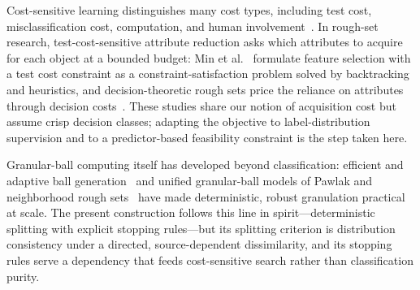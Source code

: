 
Cost-sensitive learning distinguishes many cost types, including test cost, misclassification cost, computation, and human involvement~\cite{Turney2000}. In rough-set research, test-cost-sensitive attribute reduction asks which attributes to acquire for each object at a bounded budget: Min et al.~\cite{Min2014TestCost} formulate feature selection with a test cost constraint as a constraint-satisfaction problem solved by backtracking and heuristics, and decision-theoretic rough sets price the reliance on attributes through decision costs~\cite{Jia2013MinCost,Zhao2009DTRS}. These studies share our notion of acquisition cost but assume crisp decision classes; adapting the objective to label-distribution supervision and to a predictor-based feasibility constraint is the step taken here.

Granular-ball computing itself has developed beyond classification: efficient and adaptive ball generation~\cite{Xia2023GBadaptive} and unified granular-ball models of Pawlak and neighborhood rough sets~\cite{Xia2023GBRS} have made deterministic, robust granulation practical at scale. The present construction follows this line in spirit---deterministic splitting with explicit stopping rules---but its splitting criterion is distribution consistency under a directed, source-dependent dissimilarity, and its stopping rules serve a dependency that feeds cost-sensitive search rather than classification purity.
